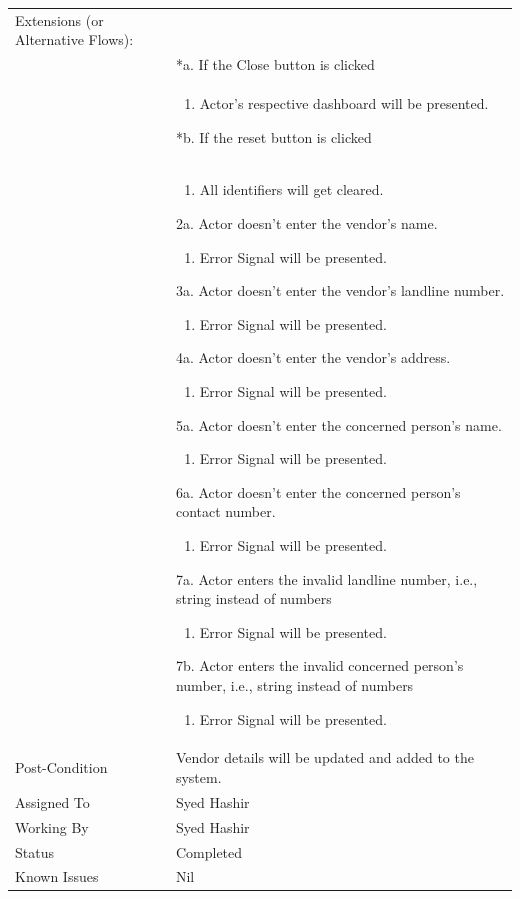 \documentclass[12pt,a4paper]{article}
\begin{document}
\begin{longtable}{| p{3cm}|p{12cm}|}
Extensions (or Alternative Flows):\\
& *a. If the Close button is clicked \\
& \begin{enumerate}
		\item Actor's respective dashboard will be presented.
	\end{enumerate}
*b. If the reset button is clicked \\
&	\begin{enumerate}
		\item All identifiers will get cleared.
	\end{enumerate}
2a. Actor doesn't enter the vendor's name.
 	\begin{enumerate}
		\item Error Signal will be presented.
	\end{enumerate}
3a. Actor doesn't enter the vendor's landline number.
 	\begin{enumerate}
		\item Error Signal will be presented.
	\end{enumerate}
4a. Actor doesn't enter the vendor's address.
 	\begin{enumerate}
		\item Error Signal will be presented.
	\end{enumerate}
5a. Actor doesn't enter the concerned person's name.
 	\begin{enumerate}
		\item Error Signal will be presented.
	\end{enumerate}
6a. Actor doesn't enter the concerned person's contact number.
 	\begin{enumerate}
		\item Error Signal will be presented.
	\end{enumerate}
7a. Actor enters the invalid landline number, i.e., string instead of numbers
	\begin{enumerate}
		\item Error Signal will be presented.
	\end{enumerate}
7b. Actor enters the invalid concerned person's number, i.e., string instead of numbers
	\begin{enumerate}
		\item Error Signal will be presented.
	\end{enumerate}
\\ \hline
Post-Condition &  Vendor details will be updated and added to the system. \\ \hline
Assigned To &  Syed Hashir
\\ \hline
Working By &   Syed Hashir
\\ \hline
Status & 	Completed	
\\ \hline
Known Issues & Nil
\\\hline
\end{longtable}
\end{document}
